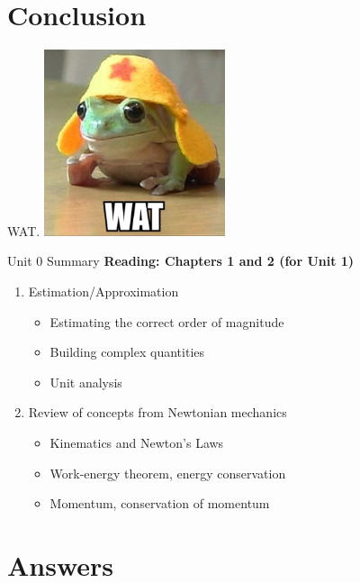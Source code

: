 \documentclass{beamer}
\begin{document}
\section{Conclusion}

\begin{frame}{WAT.}
\centering
\includegraphics[width=0.4\textwidth]{figures/frogs-know-wats.png}
\end{frame}

\begin{frame}{Unit 0 Summary}
\textbf{Reading: Chapters 1 and 2 (for Unit 1)}
\begin{enumerate}
\item Estimation/Approximation
\begin{itemize}
\item \alert{Estimating} the correct order of magnitude
\item \alert{Building} complex quantities
\item \alert{Unit analysis}
\end{itemize}
\item Review of concepts from Newtonian mechanics
\begin{itemize}
\item Kinematics and \alert{Newton's Laws}
\item Work-energy theorem, energy conservation
\item Momentum, conservation of momentum
\end{itemize}
\end{enumerate}
\end{frame}

\section{Answers}
\end{document}
